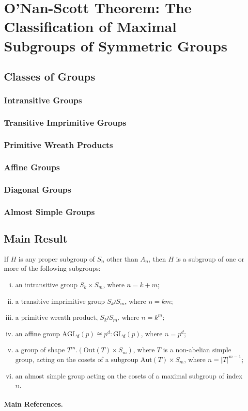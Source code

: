 \section{O'Nan-Scott Theorem: The Classification of Maximal Subgroups of Symmetric Groups}
\subsection{Classes of Groups}
\subsubsection{Intransitive Groups}
\subsubsection{Transitive Imprimitive Groups}
\subsubsection{Primitive Wreath Products}
\subsubsection{Affine Groups}
\subsubsection{Diagonal Groups}
\subsubsection{Almost Simple Groups}

\subsection{Main Result}
\begin{theorem}
	 If $H$ is any proper subgroup of $S_n$ other than $A_n$, then $H$ is a subgroup of one or more of the following subgroups:
	\begin{enumerate}[(i)]
		\item an intransitive group $S_k \times S_m$, where $n = k + m$;
		\item a transitive imprimitive group $S_k \wr S_m$, where $n = km$;
		\item a primitive wreath product, $S_k \wr S_m$, where $n = k^m$;
		\item an affine group $\text{AGL}_d(p) \cong p^d : \text{GL}_d(p)$, where $n = p^d$;
		\item a group of shape $T^m.(\text{Out}(T) \times S_m)$, where $T$ is a non-abelian simple group, acting on the cosets of a subgroup $\text{Aut}(T) \times S_m$, where $n = |T|^{m-1}$;
		\item an almost simple group acting on the cosets of a maximal subgroup of index $n$.
	\end{enumerate}
\end{theorem}

\paragraph{Main References.} \cite{Wilson2009,Cameron1999,Smith2018,Liebeck1988,Aschbacher1985}